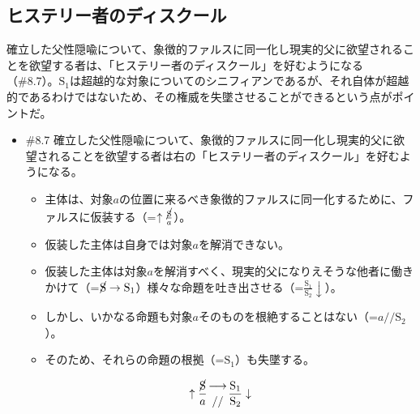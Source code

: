 \subsection{ヒステリー者のディスクール}\label{ux30d2ux30b9ux30c6ux30eaux30fcux8005ux306eux30c7ux30a3ux30b9ux30afux30fcux30eb}

確立した父性隠喩について、象徴的ファルスに同一化し現実的父に欲望されることを欲望する者は、「\mbox{ヒステリー者のディスクール}」を好むようになる（\#8.7）。\(\textrm{S}_1\)は超越的な対象についてのシニフィアンであるが、それ自体が超越的であるわけではないため、その権威を失墜させることができるという点がポイントだ。

\begin{note}{}
  \begin{itemize}
    \tightlist
    \item{\#8.7}
      確立した父性隠喩について、象徴的ファルスに同一化し現実的父に欲望されることを欲望する者は右の「\mbox{ヒステリー者のディスクール}」を好むようになる。
      \begin{itemize}
          \tightlist
          \item
          主体は、対象$a$の位置に来るべき象徴的ファルスに同一化するために、ファルスに仮装する（=$\uparrow\frac{\cancel{\textrm{S}}}{a}$）。
          \item
          仮装した主体は自身では対象$a$を解消できない。
          \item
          仮装した主体は対象$a$を解消すべく、現実的父になりえそうな他者に働きかけて（=$\cancel{\textrm{S}}\rightarrow\textrm{S}_1$）様々な命題を吐き出させる（=$\frac{\textrm{S}_1}{\textrm{S}_2}\downarrow$）。
          \item
          しかし、いかなる命題も対象$a$そのものを根絶することはない（=$a//\textrm{S}_2$）。
          \item
          そのため、それらの命題の根拠（=$\textrm{S}_1$）も失墜する。
        \end{itemize}

$$
\uparrow\frac{\cancel{\textrm{S}}}{a}\genfrac{}{}{0pt}{}{\longrightarrow}{//}\frac{\mathrm{S_1}}{\mathrm{S_2}}\downarrow
$$
  \end{itemize}
\end{note}

